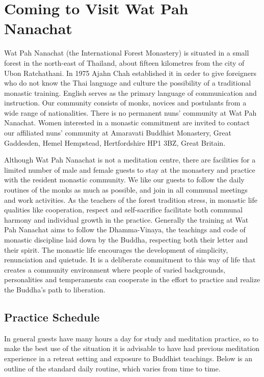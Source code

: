 
\chapter{Coming to Visit Wat Pah Nanachat}

Wat Pah Nanachat (the International Forest Monastery) is situated in a
small forest in the north-east of Thailand, about fifteen kilometres
from the city of Ubon Ratchathani. In 1975 Ajahn Chah established it in
order to give foreigners who do not know the Thai language and culture
the possibility of a traditional monastic training. English serves as
the primary language of communication and instruction. Our community
consists of monks, novices and postulants from a wide range of
nationalities. There is no permanent nuns' community at Wat Pah
Nanachat. Women interested in a monastic commitment are invited to
contact our affiliated nuns' community at Amaravati Buddhist Monastery,
Great Gaddesden, Hemel Hempstead, Hertfordshire HP1 3BZ, Great Britain.

Although Wat Pah Nanachat is not a meditation centre, there are
facilities for a limited number of male and female guests to stay at the
monastery and practice with the resident monastic community. We like our
guests to follow the daily routines of the monks as much as possible,
and join in all communal meetings and work activities. As the teachers
of the forest tradition stress, in monastic life qualities like
cooperation, respect and self-sacrifice facilitate both communal harmony
and individual growth in the practice. Generally the training at Wat Pah
Nanachat aims to follow the Dhamma-Vinaya, the teachings and code of
monastic discipline laid down by the Buddha, respecting both their
letter and their spirit. The monastic life encourages the development of
simplicity, renunciation and quietude. It is a deliberate commitment to
this way of life that creates a community environment where people of
varied backgrounds, personalities and temperaments can cooperate in the
effort to practice and realize the Buddha's path to liberation.

\section{Practice Schedule}

In general guests have many hours a day for study and meditation
practice, so to make the best use of the situation it is advisable to
have had previous meditation experience in a retreat setting and
exposure to Buddhist teachings.  Below is an outline of the standard
daily routine, which varies from time to time.

